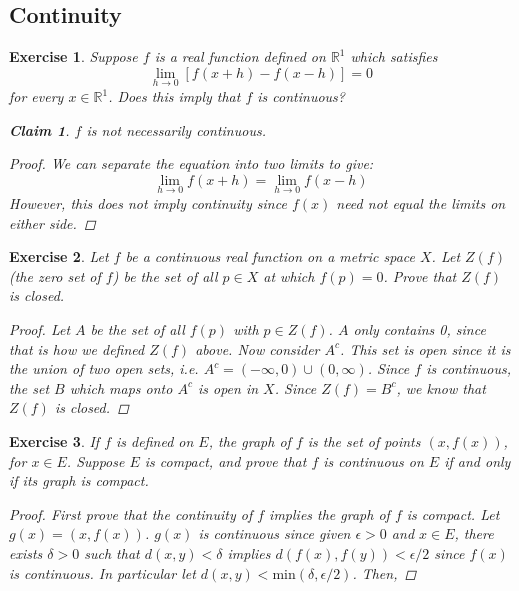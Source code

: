 \documentclass[10pt,letterpaper]{amsart}
\newtheorem{exercise}{Exercise}[section]
\newtheorem*{claim}{Claim}
\theoremstyle{definition}
\theoremstyle{remark}
\numberwithin{equation}{exercise}
\begin{document}
\begin{multicols}{2}
  \section{Continuity}
  \begin{exercise}\label{4.1}
    Suppose $f$ is a real function defined on $\mathbb{R}^1$ which satisfies
    \begin{equation*}
      \lim_{h \rightarrow 0} \left[ f\left(x+h\right) - f\left(x-h\right) \right] = 0
    \end{equation*}
    for every $x \in \mathbb{R}^1$. Does this imply that $f$ is continuous?
    \begin{claim}
      $f$ is not necessarily continuous.
    \end{claim}
    \begin{proof}
      We can separate the equation into two limits to give:
      \begin{equation*}
        \lim_{h \rightarrow 0} f(x+h) = \lim_{h \rightarrow 0} f(x-h)
      \end{equation*}
      However, this does not imply continuity since $f(x)$ need not equal the limits on either side.
    \end{proof}
  \end{exercise}
  \setcounter{exercise}{2}
  \begin{exercise}\label{4.3}
    Let $f$ be a continuous real function on a metric space $X$. Let $Z(f)$ (the \emph{zero set} of $f$) be the set of all $p \in X$ at which $f(p) = 0$. Prove that $Z(f)$ is closed.
    \begin{proof}
      Let $A$ be the set of all $f(p)$ with $p \in Z(f)$. $A$ only contains 0, since that is how we defined $Z(f)$ above. Now consider $A^c$. This set is open since it is the union of two open sets, i.e. $A^c = (-\infty,0) \cup (0,\infty)$. Since $f$ is continuous, the set $B$ which maps onto $A^c$ is open in $X$. Since $Z(f) = B^c$, we know that $Z(f)$ is closed.
    \end{proof}
  \end{exercise}
  \setcounter{exercise}{5}
  \begin{exercise}\label{4.6}
    If $f$ is defined on $E$, the \emph{graph} of $f$ is the set of points $(x,f(x))$, for $x \in E$. Suppose $E$ is compact, and prove that $f$ is continuous on $E$ if and only if its graph is compact.
    \begin{proof}
      First prove that the continuity of $f$ implies the graph of $f$ is compact. Let $g(x) = (x,f(x))$. $g(x)$ is continuous since given $\epsilon > 0$ and $x \in E$, there exists $\delta > 0$ such that $d(x,y) < \delta$ implies $d(f(x),f(y)) < \epsilon / 2$ since $f(x)$ is continuous. In particular let $d(x,y) < \mathrm{min}(\delta,\epsilon/2)$. Then,

\end{proof}
\end{exercise}
\end{multicols}
\end{document}
